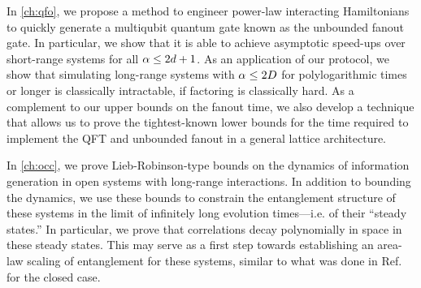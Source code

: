 In \cref{ch:qfo}, we propose a method to engineer power-law interacting Hamiltonians to quickly generate a multiqubit quantum gate known as the unbounded fanout gate. In particular, we show that it is able to achieve asymptotic speed-ups over short-range systems for all $\alpha \le 2d+1$. As an application of our protocol, we show that simulating long-range systems with $\alpha \le 2D$ for polylogarithmic times or longer is classically intractable, if factoring is classically hard. As a complement to our upper bounds on the fanout time, we also develop a technique that allows us to prove the tightest-known lower bounds for the time required to implement the QFT and unbounded fanout in a general lattice architecture.

In \cref{ch:occ}, we prove Lieb-Robinson-type bounds on the dynamics of information generation in open systems with long-range interactions. In addition to bounding the dynamics, we use these  bounds to constrain the entanglement structure of these systems in the limit of infinitely long evolution times---i.e. of their ``steady states.'' In particular, we prove that correlations decay polynomially in space in these steady states. This may serve as a first step towards establishing an area-law scaling of entanglement for these systems, similar to what was done in Ref.~\cite{Gong2017} for the closed case. %
